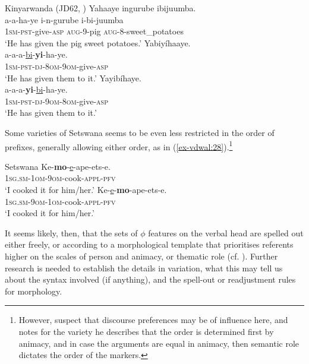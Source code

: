 \documentclass[output=paper
,modfonts
,nonflat]{langsci/langscibook}
\begin{document}
\begin{exe}
\ex	Kinyarwanda (JD62, \citealt[212]{Zeller_Ngoboka2015}) \label{ex-vdwal:27}
	\xlist
	\ex	\label{ex-vdwal:27a}
		\glll	 Yahaaye ingurube ibijuumba.\\
		 a-a-ha-ye i-n-gurube i-bi-juumba \\
		\textsc{1sm-pst}-give-\textsc{asp} \textsc{aug}-9-pig \textsc{aug}-8-sweet\_potatoes \\
		\glt `He has given the pig sweet potatoes.' 
	\ex \label{ex-vdwal:27b}
			 Yabiyíhaaye.\\
		\gll a-a-a-\uline{bi}-\textbf{yi}-ha-ye.\\
		\textsc{1sm-pst-dj-8om-9om}-give-\textsc{asp}\\
		\glt `He has given them to it.' 
	\ex \label{ex-vdwal:27c}
			 Yayibíhaye.\\
		\gll a-a-a-\textbf{yi}-\uline{bi}-ha-ye. \\
		\textsc{1sm-pst-dj-9om-8om}-give-\textsc{asp} \\
		\glt `He has given them to it.' 
	\endxlist
\end{exe}
Some varieties of Setswana seems to be even less restricted in the order of prefixes, generally allowing either order, as in (\ref{ex-vdwal:28}).\footnote{However, \citet{Pretorius_et_al2012} suspect that discourse preferences may be of influence here, and \citet{Creissels2002} notes for the variety he describes that the order is determined first by animacy, and in case the arguments are equal in animacy, then semantic role dictates the order of the markers.} 

\begin{exe}
\ex	Setswana \citep[247]{Marten_Kula2012} \label{ex-vdwal:28}
	\xlist
	\ex	
		\gll Ke-\textbf{mo}-\uline{e}-ape-ets-e.\\
		\textsc{1sg.sm-1om-9om}-cook-\textsc{appl-pfv}\\
		\glt `I cooked it for him/her.'
	\ex 
		\gll  Ke-\uline{e}-\textbf{mo}-ape-ets-e.\\
		\textsc{1sg.sm-9om-1om}-cook-\textsc{appl-pfv}\\
		\glt `I cooked it for him/her.'
	\endxlist
\end{exe}
It seems likely, then, that the sets of $\phi$ features on the verbal head are spelled out either freely, or according to a morphological template that prioritises referents higher on the scales of person and animacy, or thematic role (cf. \citealt{Duranti1979}). Further research is needed to establish the details in variation, what this may tell us about the syntax involved (if anything), and the spell-out or readjustment rules for morphology.
\end{document}
